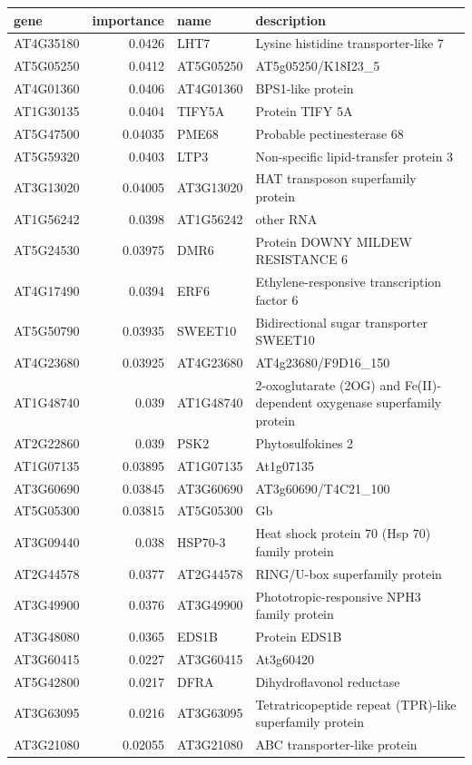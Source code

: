 \documentclass[11pt]{article}
\begin{document}
\begin{center}
\begin{tabular}{lrll}
gene & importance & name & description\\
\hline
AT4G35180 & 0.0426 & LHT7 & Lysine histidine transporter-like 7\\
AT5G05250 & 0.0412 & AT5G05250 & AT5g05250/K18I23\_5\\
AT4G01360 & 0.0406 & AT4G01360 & BPS1-like protein\\
AT1G30135 & 0.0404 & TIFY5A & Protein TIFY 5A\\
AT5G47500 & 0.04035 & PME68 & Probable pectinesterase 68\\
AT5G59320 & 0.0403 & LTP3 & Non-specific lipid-transfer protein 3\\
AT3G13020 & 0.04005 & AT3G13020 & HAT transposon superfamily protein\\
AT1G56242 & 0.0398 & AT1G56242 & other RNA\\
AT5G24530 & 0.03975 & DMR6 & Protein DOWNY MILDEW RESISTANCE 6\\
AT4G17490 & 0.0394 & ERF6 & Ethylene-responsive transcription factor 6\\
AT5G50790 & 0.03935 & SWEET10 & Bidirectional sugar transporter SWEET10\\
AT4G23680 & 0.03925 & AT4G23680 & AT4g23680/F9D16\_150\\
AT1G48740 & 0.039 & AT1G48740 & 2-oxoglutarate (2OG) and Fe(II)-dependent oxygenase superfamily protein\\
AT2G22860 & 0.039 & PSK2 & Phytosulfokines 2\\
AT1G07135 & 0.03895 & AT1G07135 & At1g07135\\
AT3G60690 & 0.03845 & AT3G60690 & AT3g60690/T4C21\_100\\
AT5G05300 & 0.03815 & AT5G05300 & Gb\\
AT3G09440 & 0.038 & HSP70-3 & Heat shock protein 70 (Hsp 70) family protein\\
AT2G44578 & 0.0377 & AT2G44578 & RING/U-box superfamily protein\\
AT3G49900 & 0.0376 & AT3G49900 & Phototropic-responsive NPH3 family protein\\
AT3G48080 & 0.0365 & EDS1B & Protein EDS1B\\
AT3G60415 & 0.0227 & AT3G60415 & At3g60420\\
AT5G42800 & 0.0217 & DFRA & Dihydroflavonol reductase\\
AT3G63095 & 0.0216 & AT3G63095 & Tetratricopeptide repeat (TPR)-like superfamily protein\\
AT3G21080 & 0.02055 & AT3G21080 & ABC transporter-like protein\\
\end{tabular}
\end{center}
\end{document}
